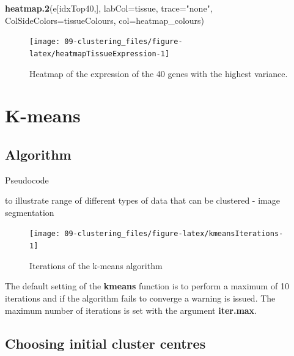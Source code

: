 \documentclass[]{book}
\newenvironment{Shaded}{\begin{snugshade}}{\end{snugshade}}
\newcommand{\KeywordTok}[1]{\textcolor[rgb]{0.13,0.29,0.53}{\textbf{{#1}}}}
\newcommand{\DataTypeTok}[1]{\textcolor[rgb]{0.13,0.29,0.53}{{#1}}}
\newcommand{\StringTok}[1]{\textcolor[rgb]{0.31,0.60,0.02}{{#1}}}
\newcommand{\NormalTok}[1]{{#1}}
\theoremstyle{definition}
\theoremstyle{definition}
\theoremstyle{definition}
\theoremstyle{remark}
\begin{document}
\begin{Shaded}
\begin{Highlighting}[]
\KeywordTok{heatmap.2}\NormalTok{(e[idxTop40,], }\DataTypeTok{labCol=}\NormalTok{tissue, }\DataTypeTok{trace=}\StringTok{"none"}\NormalTok{,}
          \DataTypeTok{ColSideColors=}\NormalTok{tissueColours, }\DataTypeTok{col=}\NormalTok{heatmap_colours)}
\end{Highlighting}
\end{Shaded}

\begin{figure}

{\centering \texttt{[image: 09-clustering\_files/figure-latex/heatmapTissueExpression-1]} 

}

\caption{Heatmap of the expression of the 40 genes with the highest variance.}\label{fig:heatmapTissueExpression}
\end{figure}

\section{K-means}\label{k-means}

\subsection{Algorithm}\label{algorithm}

Pseudocode

to illustrate range of different types of data that can be clustered -
image segmentation

\begin{figure}

{\centering \texttt{[image: 09-clustering\_files/figure-latex/kmeansIterations-1]} 

}

\caption{Iterations of the k-means algorithm}\label{fig:kmeansIterations}
\end{figure}

The default setting of the \textbf{kmeans} function is to perform a
maximum of 10 iterations and if the algorithm fails to converge a
warning is issued. The maximum number of iterations is set with the
argument \textbf{iter.max}.

\subsection{Choosing initial cluster
centres}\label{choosing-initial-cluster-centres}
\end{document}
